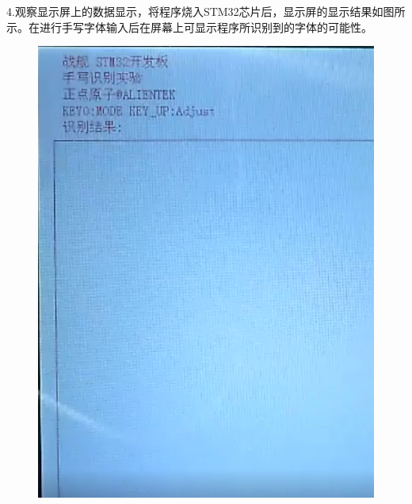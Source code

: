 \documentclass[UTF8]{ctexart}
\begin{document}
4.观察显示屏上的数据显示，将程序烧入STM32芯片后，显示屏的显示结果如图所示。在进行手写字体输入后在屏幕上可显示程序所识别到的字体的可能性。
\begin{figure}[H]
	\centering
	\includegraphics[scale = 0.3]{15}
\end{figure}
\end{document}
